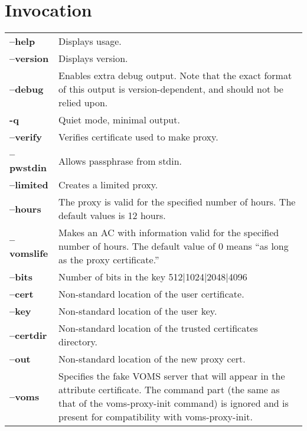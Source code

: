\documentclass[a4paper]{book}
\begin{document}
\section{Invocation}
\begin{longtable}{lp{3in}}

\textbf{--help}         & Displays usage.\\
\textbf{--version}      & Displays version.\\
\textbf{--debug}        & Enables extra debug output.  Note that the
                          exact format of this output is
                          version-dependent, and should not be relied
                          upon.\\
\textbf{-q}             & Quiet mode, minimal output.\\
\textbf{--verify}       & Verifies certificate used to make proxy.\\
\textbf{--pwstdin}      & Allows passphrase from stdin.\\
\textbf{--limited}      & Creates a limited proxy.\\
\textbf{--hours}        & The proxy is valid for the specified number
                          of hours.  The default values is 12 hours.\\
\textbf{--vomslife}     & Makes an AC with information valid for the
                          specified number of hours.  The default
                          value of 0 means ``as long as the proxy
                          certificate.''\\
\textbf{--bits}         & Number of bits in the key {512|1024|2048|4096}\\
\textbf{--cert}         & Non-standard location of the user certificate.\\
\textbf{--key}          & Non-standard location of the user key.\\
\textbf{--certdir}      & Non-standard location of the trusted
                          certificates directory.\\
\textbf{--out}          & Non-standard location of the new proxy
                          cert.\\
\textbf{--voms}         & Specifies the fake VOMS server that will
                          appear in the attribute certificate.  The
                          command part (the same as that of the
                          voms-proxy-init command) is ignored and is
                          present for compatibility with
                          voms-proxy-init.\\

\end{longtable}
\end{document}
